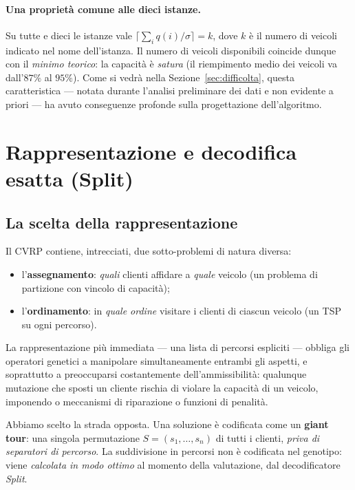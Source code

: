 \documentclass[10pt,a4paper]{article}
\begin{document}
\paragraph{Una proprietà comune alle dieci istanze.}
Su tutte e dieci le istanze vale $\lceil \sum_i q(i) / \sigma \rceil = k$, dove
$k$ è il numero di veicoli indicato nel nome dell'istanza. Il numero di veicoli
disponibili coincide dunque con il \emph{minimo teorico}: la capacità è
\emph{satura} (il riempimento medio dei veicoli va dall'$87\%$ al $95\%$). Come
si vedrà nella Sezione~\ref{sec:difficolta}, questa caratteristica --- notata
durante l'analisi preliminare dei dati e non evidente a priori --- ha avuto
conseguenze profonde sulla progettazione dell'algoritmo.

\section{Rappresentazione e decodifica esatta (Split)}
\label{sec:split}

\subsection{La scelta della rappresentazione}

Il CVRP contiene, intrecciati, due sotto-problemi di natura diversa:
\begin{itemize}\itemsep1pt
  \item l'\textbf{assegnamento}: \emph{quali} clienti affidare a \emph{quale} veicolo (un problema di partizione con vincolo di capacità);
  \item l'\textbf{ordinamento}: in \emph{quale ordine} visitare i clienti di ciascun veicolo (un TSP su ogni percorso).
\end{itemize}

La rappresentazione più immediata --- una lista di percorsi espliciti --- obbliga
gli operatori genetici a manipolare simultaneamente entrambi gli aspetti, e
soprattutto a preoccuparsi costantemente dell'ammissibilità: qualunque mutazione
che sposti un cliente rischia di violare la capacità di un veicolo, imponendo o
meccanismi di riparazione o funzioni di penalità.

Abbiamo scelto la strada opposta. Una soluzione è codificata come un
\textbf{giant tour}: una singola permutazione $S=(s_1,\dots,s_{n})$ di tutti i
clienti, \emph{priva di separatori di percorso}. La suddivisione in percorsi non
è codificata nel genotipo: viene \emph{calcolata in modo ottimo} al momento della
valutazione, dal decodificatore \emph{Split}.
\end{document}
